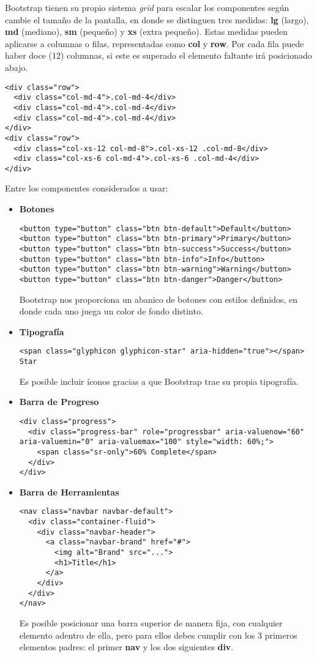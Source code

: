 Bootstrap tienen su propio sistema \textit{grid} para escalar los componentes según cambie el tamaño de la pantalla, en donde se distinguen tres medidas: \textbf{lg} (largo), \textbf{md} (mediano), \textbf{sm} (pequeño) y \textbf{xs} (extra pequeño). Estas medidas pueden aplicarse a columnas o filas, representadas como \textbf{col} y \textbf{row}. Por cada fila puede haber doce (12) columnas, si este es superado el elemento faltante irá posicionado abajo.
\begin{lstlisting}
<div class="row">
  <div class="col-md-4">.col-md-4</div>
  <div class="col-md-4">.col-md-4</div>
  <div class="col-md-4">.col-md-4</div>
</div>
<div class="row">
  <div class="col-xs-12 col-md-8">.col-xs-12 .col-md-8</div>
  <div class="col-xs-6 col-md-4">.col-xs-6 .col-md-4</div>
</div>
\end{lstlisting}

Entre los componentes considerados a usar:
\begin{itemize}
\item\textbf{Botones}
\begin{lstlisting}
<button type="button" class="btn btn-default">Default</button>
<button type="button" class="btn btn-primary">Primary</button>
<button type="button" class="btn btn-success">Success</button>
<button type="button" class="btn btn-info">Info</button>
<button type="button" class="btn btn-warning">Warning</button>
<button type="button" class="btn btn-danger">Danger</button>
\end{lstlisting}
Bootstrap nos proporciona un abanico de botones con estilos definidos, en donde cada uno juega un color de fondo distinto.

\item\textbf{Tipografía}
\begin{lstlisting}
<span class="glyphicon glyphicon-star" aria-hidden="true"></span> Star
\end{lstlisting}
Es posible incluir íconos gracias a que Bootstrap trae su propia tipografía.

\item\textbf{Barra de Progreso}
\begin{lstlisting}
<div class="progress">
  <div class="progress-bar" role="progressbar" aria-valuenow="60" aria-valuemin="0" aria-valuemax="100" style="width: 60%;">
    <span class="sr-only">60% Complete</span>
  </div>
</div>
\end{lstlisting}

\item\textbf{Barra de Herramientas}
\begin{lstlisting}
<nav class="navbar navbar-default">
  <div class="container-fluid">
    <div class="navbar-header">
      <a class="navbar-brand" href="#">
        <img alt="Brand" src="...">
        <h1>Title</h1>
      </a>
    </div>
  </div>
</nav>
\end{lstlisting}
Es posible posicionar una barra superior de manera fija, con cualquier elemento adentro de ella, pero para ellos debes cumplir con los 3 primeros elementos padres: el primer \textbf{nav} y los dos siguientes \textbf{div}.

\end{itemize}


